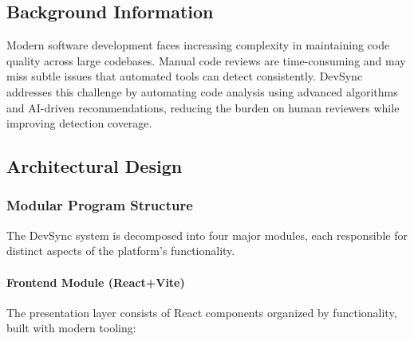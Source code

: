\documentclass[12pt,a4paper]{article}
\begin{document}
    \subsection{Background Information}

    Modern software development faces increasing complexity in maintaining code quality across large codebases. Manual code reviews are time-consuming and may miss subtle issues that automated tools can detect consistently. DevSync addresses this challenge by automating code analysis using advanced algorithms and AI-driven recommendations, reducing the burden on human reviewers while improving detection coverage.

    \subsection{Architectural Design}

    \subsubsection{Modular Program Structure}

    The DevSync system is decomposed into four major modules, each responsible for distinct aspects of the platform's functionality.

    \paragraph{Frontend Module (React+Vite)}

    The presentation layer consists of React components organized by functionality, built with modern tooling:
\end{document}
